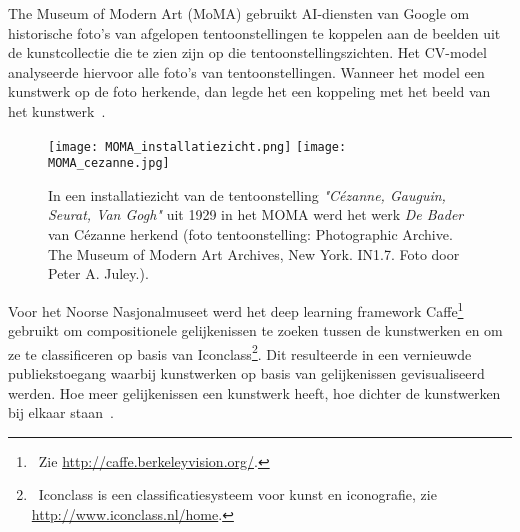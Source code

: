 The Museum of Modern Art (MoMA) gebruikt AI-diensten van Google om historische foto’s van afgelopen tentoonstellingen te koppelen aan de beelden uit de kunstcollectie die te zien zijn op die tentoonstellingszichten. Het CV-model analyseerde hiervoor alle foto’s van tentoonstellingen. Wanneer het model een kunstwerk op de foto herkende, dan legde het een koppeling met het beeld van het kunstwerk~\autocite{MOMA2018?}. 

\begin{figure}
	\centering
	\texttt{[image: MOMA\_installatiezicht.png]}\hfill
	\texttt{[image: MOMA\_cezanne.jpg]}\hfill
	\caption[Installatiezicht van MOMA waarin de AI-diensten van Google Arts \& Culture een schilderij van Cézanne herkennen]{In een installatiezicht van de tentoonstelling \textit{"Cézanne, Gauguin, Seurat, Van Gogh"} uit 1929 in het MOMA werd het werk \textit{De Bader} van Cézanne herkend (foto tentoonstelling: Photographic Archive. The Museum of Modern Art Archives, New York. IN1.7. Foto door Peter A. Juley.).}
\end{figure}

Voor het Noorse Nasjonalmuseet werd het deep learning framework Caffe\footnote{~Zie \url{http://caffe.berkeleyvision.org/}.} gebruikt om compositionele gelijkenissen te zoeken tussen de kunstwerken en om ze te classificeren op basis van Iconclass\footnote{~Iconclass is een classificatiesysteem voor kunst en iconografie, zie \url{http://www.iconclass.nl/home}.}. Dit resulteerde in een vernieuwde publiekstoegang waarbij kunstwerken op basis van gelijkenissen gevisualiseerd werden. Hoe meer gelijkenissen een kunstwerk heeft, hoe dichter de kunstwerken bij elkaar staan~\autocite{Nasjonalmuseet2017?}.


